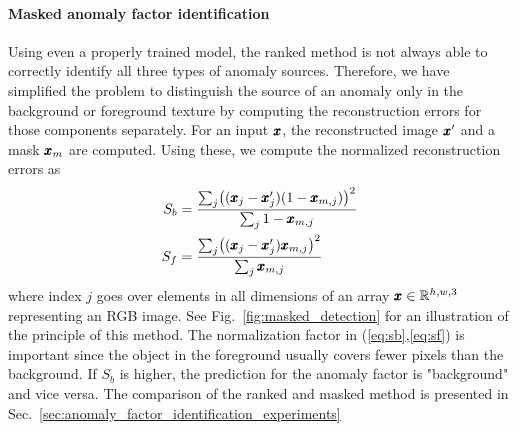 \paragraph{Masked anomaly factor identification}
Using even a properly trained model, the ranked method is not always able to correctly identify all three types of anomaly sources. Therefore, we have simplified the problem to distinguish the source of an anomaly only in the background or foreground texture by computing the reconstruction errors for those components separately. For an input $\pmb{{x}}$, the reconstructed image $\pmb{{x}}'$ and a mask $\pmb{{x}}_m$ are computed. Using these, we compute the normalized reconstruction errors as
\begin{align}
    S_b & = \frac{\sum_j \left( (\vc{x}_j-\vc{x}_{j}') (1-\vc{x}_{m,j}) \right) ^ 2}{\sum_j 1-\vc{x}_{m,j}} \label{eq:sb} \\
    S_f & = \frac{\sum_j \left( (\vc{x}_j-\vc{x}_{j}') \vc{x}_{m,j} \right) ^ 2}{\sum_j \vc{x}_{m,j}}  \label{eq:sf}
\end{align}
where index $j$ goes over elements in all dimensions of an array $\pmb{{x}} \in \mathbb{R}^{h,w,3}$ representing an RGB image. See Fig.~\ref{fig:masked_detection} for an illustration of the principle of this method. The normalization factor in (\ref{eq:sb},\ref{eq:sf}) is important since the object in the foreground usually covers fewer pixels than the background. If $S_b$ is higher, the prediction for the anomaly factor is "background" and vice versa. The comparison of the ranked and masked method is presented in Sec.~\ref{sec:anomaly_factor_identification_experiments}


